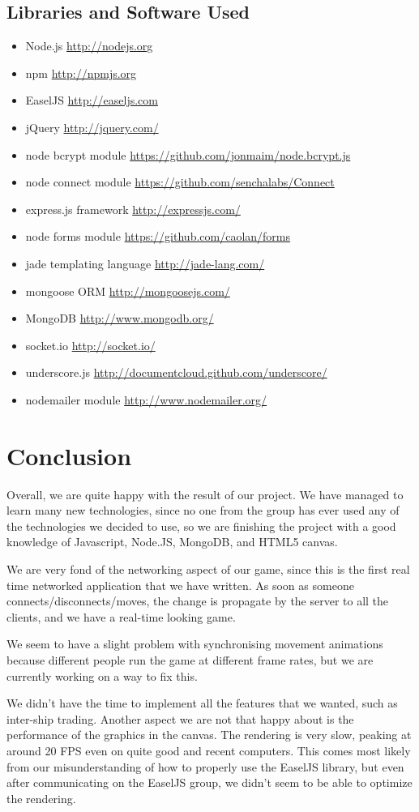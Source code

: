 \documentclass[a4paper,11pt]{article}
\begin{document}
		\subsection{Libraries and Software Used}
			\begin{itemize}
				\item Node.js \url{http://nodejs.org}
				\item npm \url{http://npmjs.org}
				\item EaselJS \url{http://easeljs.com}
				\item jQuery \url{http://jquery.com/}
				\item node bcrypt module \url{https://github.com/jonmaim/node.bcrypt.js}
				\item node connect module \url{https://github.com/senchalabs/Connect}
				\item express.js framework \url{http://expressjs.com/}
				\item node forms module \url{https://github.com/caolan/forms}
				\item jade templating language \url{http://jade-lang.com/}
				\item mongoose ORM \url{http://mongoosejs.com/}
				\item MongoDB \url{http://www.mongodb.org/}
				\item socket.io \url{http://socket.io/}
				\item underscore.js \url{http://documentcloud.github.com/underscore/}
				\item nodemailer module \url{http://www.nodemailer.org/}
			\end{itemize}
	
	\section{Conclusion}
	Overall, we are quite happy with the result of our project. We have managed to learn many new technologies, since no one from the group has ever used any of the technologies we decided to use, so we are finishing the project with a good knowledge of Javascript, Node.JS, MongoDB, and HTML5 canvas.
	
	We are very fond of the networking aspect of our game, since this is the first real time networked application that we have written. As soon as someone connects/disconnects/moves, the change is propagate by the server to all the clients, and we have a real-time looking game. 
	
	We seem to have a slight problem with synchronising movement animations because different people run the game at different frame rates, but we are currently working on a way to fix this.
	
	We didn't have the time to implement all the features that we wanted, such as inter-ship trading. Another aspect we are not that happy about is the performance of the graphics in the canvas. The rendering is very slow, peaking at around 20 FPS even on quite good and recent computers. This comes most likely from our misunderstanding of how to properly use the EaselJS library, but even after communicating on the EaselJS group, we didn't seem to be able to optimize the rendering.
\end{document}
